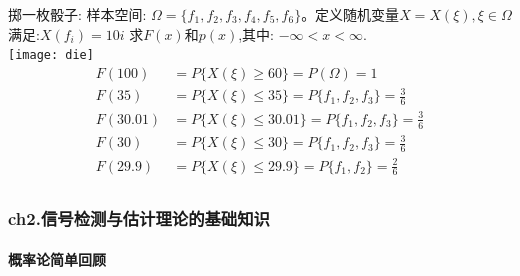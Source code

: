 \begin{frame}[shrink]
掷一枚骰子: 样本空间: $\Omega=\{f_1,f_2,f_3,f_4,f_5,f_6\}$。定义随机变量$X=X(\xi),\xi\in \Omega$满足:$X(f_i)=10i$
求$F(x)$和$p(x)$,其中: $-\infty<x<\infty$.\\
\texttt{[image: die]}
\begin{align*}
F(100)&=P\{X(\xi)\ge 60 \}=P(\Omega)=1\\
F(35)&=P\{X(\xi)\le 35 \}=P\{f_1,f_2,f_3 \}=\frac{3}{6} \\
F(30.01)&=P\{X(\xi)\le 30.01 \}=P\{f_1,f_2,f_3 \}=\frac{3}{6} \\
F(30)&=P\{X(\xi)\le 30 \}=P\{f_1,f_2,f_3 \}=\frac{3}{6} \\
F(29.9)&=P\{X(\xi)\le 29.9 \}=P\{f_1,f_2 \}=\frac{2}{6} \\
\end{align*}
\end{frame}

\begin{frame}[shrink]
\frametitle{ch2.信号检测与估计理论的基础知识}
\framesubtitle{概率论简单回顾}
\tableofcontents[hideallsubsections]
\end{frame}



